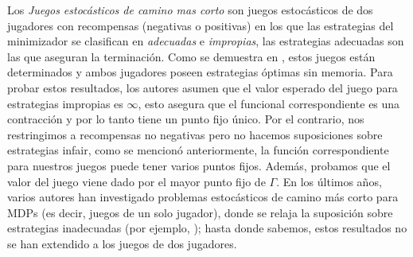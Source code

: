 

















Los \emph{Juegos estocásticos de camino mas corto} \cite{PatekBertsekas99} son juegos estocásticos de dos jugadores con recompensas (negativas o positivas) en los que las estrategias del minimizador se clasifican en \emph{adecuadas} e \emph{impropias},
las estrategias adecuadas son las que aseguran la terminación. Como se demuestra en \cite{PatekBertsekas99}, estos juegos están determinados y ambos jugadores poseen estrategias óptimas sin memoria. Para probar estos resultados, los autores asumen que el valor esperado del juego para estrategias impropias es $\infty$, esto asegura que el funcional correspondiente es una contracción y por lo tanto tiene un punto fijo único. Por el contrario, nos restringimos a recompensas no negativas pero no hacemos suposiciones sobre estrategias infair, como se mencionó anteriormente, la función correspondiente para nuestros juegos puede tener varios puntos fijos. Además, probamos que el valor del juego viene dado por el mayor punto fijo de $\Gamma$. En los últimos años, varios autores han investigado problemas estocásticos de camino más corto para MDPs (es decir, juegos de un solo jugador), donde se relaja la suposición sobre estrategias inadecuadas (por ejemplo, \cite{DBLP:conf/lics/Baier0DGS18}); hasta donde sabemos, estos resultados no se han extendido a los juegos de dos jugadores.

	
